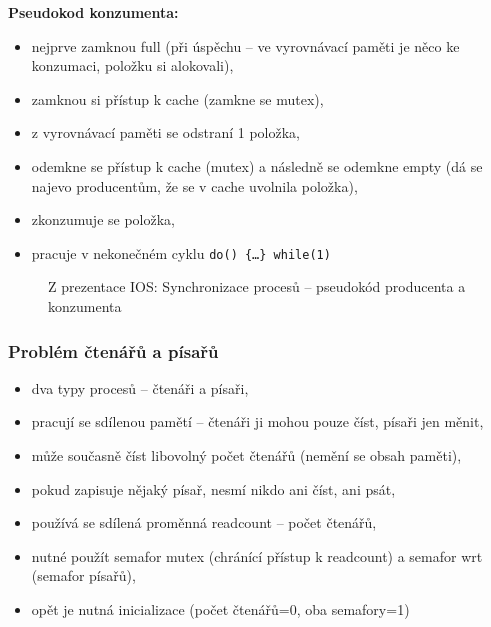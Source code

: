 \documentclass[a4paper, 11pt]{article}
\newcommand{\tcmd}[1]{\texttt{#1}}
\begin{document}
\textbf{Pseudokod konzumenta:}
\begin{itemize}
    \item nejprve zamknou full (při úspěchu -- ve vyrovnávací paměti je něco ke konzumaci, položku si alokovali),
    \item zamknou si přístup k cache (zamkne se mutex),
    \item z vyrovnávací paměti se odstraní 1 položka,
    \item odemkne se přístup k cache (mutex) a následně se odemkne empty (dá se najevo producentům, že se v cache uvolnila položka),
    \item zkonzumuje se položka,
    \item pracuje v nekonečném cyklu \tcmd{do() \{\ldots\} while(1)}
\end{itemize}

\begin{figure} [h]
    \centering
    \caption{Z prezentace IOS: Synchronizace procesů -- pseudokód producenta a konzumenta}
\end{figure}

\newpage

\subsubsection{Problém čtenářů a písařů}
\begin{itemize}
    \item dva typy procesů -- čtenáři a písaři,
    \item pracují se sdílenou pamětí -- čtenáři ji mohou pouze číst, písaři jen měnit,
    \item může současně číst libovolný počet čtenářů (nemění se obsah paměti),
    \item pokud zapisuje nějaký písař, nesmí nikdo ani číst, ani psát,
    \item používá se sdílená proměnná readcount -- počet čtenářů,
    \item nutné použít semafor mutex (chránící přístup k readcount) a semafor wrt (semafor písařů),
    \item opět je nutná inicializace (počet čtenářů=0, oba semafory=1)
\end{itemize}
\end{document}
